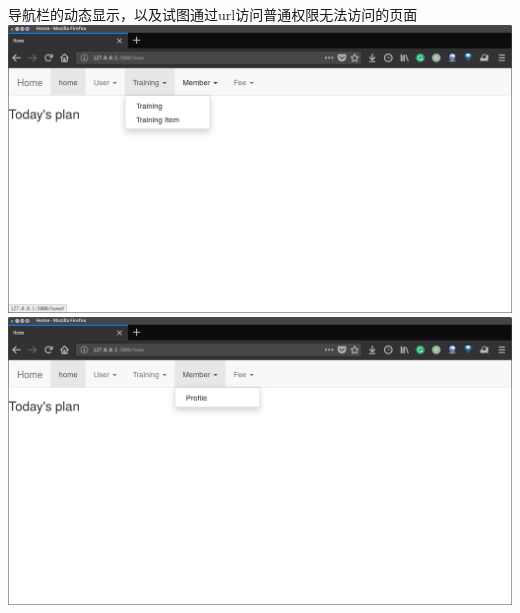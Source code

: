   导航栏的动态显示，以及试图通过url访问普通权限无法访问的页面\\
  \includegraphics[width=\textwidth]{figure/normal-login}
  \includegraphics[width=\textwidth]{figure/normal-login2}

